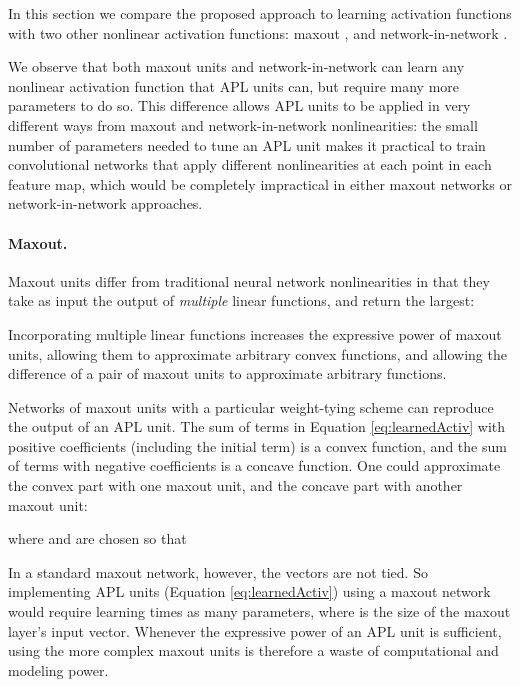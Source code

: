 \documentclass{article} \usepackage{iclr2015,times}
\begin{document}
In this section we compare the proposed approach to learning
activation functions with two other nonlinear activation functions:
maxout \citep{goodfellow2013maxout}, and network-in-network
\citep{lin2013network}.

We observe that both maxout units and network-in-network can learn any
nonlinear activation function that APL units can, but
require many more parameters to do so. This difference allows
APL units to be applied in very different ways from
maxout and network-in-network nonlinearities: the small number of
parameters needed to tune an APL unit makes it practical
to train convolutional networks that apply different nonlinearities at
each point in each feature map, which would be completely impractical
in either maxout networks or network-in-network approaches.

\paragraph{Maxout.}
Maxout units differ from traditional neural network nonlinearities in
that they take as input the output of \emph{multiple} linear
functions, and return the largest:

Incorporating multiple linear functions increases the expressive power
of maxout units, allowing them to approximate arbitrary convex
functions, and allowing the difference of a pair of maxout units to
approximate arbitrary functions.







Networks of maxout units with a particular weight-tying scheme can
reproduce the output of an APL unit. The sum of terms in
Equation \ref{eq:learnedActiv} with positive coefficients (including
the initial  term) is a convex function, and the sum of
terms with negative coefficients is a concave function. One could
approximate the convex part with one maxout unit, and the concave part
with another maxout unit:

where  and  are chosen so that

In a standard maxout network, however, the  vectors are not tied.
So implementing APL units (Equation \ref{eq:learnedActiv}) using a maxout network would require
learning  times as many parameters, where  is the size of
the maxout layer's input vector. Whenever the expressive power of an
APL unit is sufficient, using the more complex
maxout units is therefore a waste of computational and modeling power.
\end{document}
